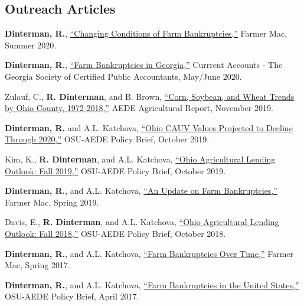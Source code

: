 \documentclass[letterpaper]{article}
\renewenvironment{itemize}{
  \begin{list}{}{
    \setlength{\leftmargin}{1.5em}
  }
}{
  \end{list}
}
\begin{document}
\subsection*{Outreach Articles}

\begin{itemize}
\item \textbf{Dinterman, R.}, \href{https://www.farmermac.com/wp-content/uploads/The-Feed-Summer-2020.pdf}{``Changing Conditions of Farm Bankruptcies,''} Farmer Mac, Summer 2020.
\item \textbf{Dinterman, R.}, \href{https://www.gscpa.org/Content/Files/Pdfs/Current%20Accounts/MayJune20%20Articles/FarmBankruptciesGA.pdf}{``Farm Bankruptcies in Georgia,''} Currrent Accounts - The Georgia Society of Certified Public Accountants, May/June 2020.

\item Zulauf, C., \textbf{R. Dinterman}, and B. Brown, \href{https://cpb-us-w2.wpmucdn.com/u.osu.edu/dist/9/29991/files/2019/11/Ohio-yield-trends-1972-2018.pdf}{``Corn, Soybean, and Wheat Trends by Ohio County, 1972-2018,''} AEDE Agricultural Report, November 2019.
\item \textbf{Dinterman, R.} and A.L. Katchova, \href{https://aede.osu.edu/sites/aede/files/publication_files/CAUVProjectionsFall2019.pdf}{``Ohio CAUV Values Projected to Decline Through 2020,''} OSU-AEDE Policy Brief, October 2019.
\item Kim, K., \textbf{R. Dinterman}, and A.L. Katchova, \href{https://aede.osu.edu/sites/aede/files/publication_files/AgLendingOutlook2019.pdf}{``Ohio Agricultural Lending Outlook: Fall 2019,''} OSU-AEDE Policy Brief, October 2019.
\item \textbf{Dinterman, R.}, and A.L. Katchova, \href{https://www.farmermac.com/wp-content/uploads/The-Feed-Spring-2019.pdf}{``An Update on Farm Bankruptcies,''} Farmer Mac, Spring 2019.

\item Davis, E., \textbf{R. Dinterman}, and A.L. Katchova, \href{https://aede.osu.edu/sites/aede/files/publication_files/AgLendingOutlook2018.pdf}{``Ohio Agricultural Lending Outlook: Fall 2018,''} OSU-AEDE Policy Brief, October 2018.

\item \textbf{Dinterman, R.}, and A.L. Katchova, \href{https://www.farmermac.com/wp-content/uploads/The-Feed-Spring-2017.pdf}{``Farm Bankruptcies Over Time,''} Farmer Mac, Spring 2017.
\item \textbf{Dinterman, R.}, and A.L. Katchova, \href{https://aede.osu.edu/sites/aede/files/publication_files/Farm%20Bankruptcies%20-%20Policy%20Brief.pdf}{``Farm Bankruptcies in the United States,''} OSU-AEDE Policy Brief, April 2017.
\end{itemize}
\end{document}
